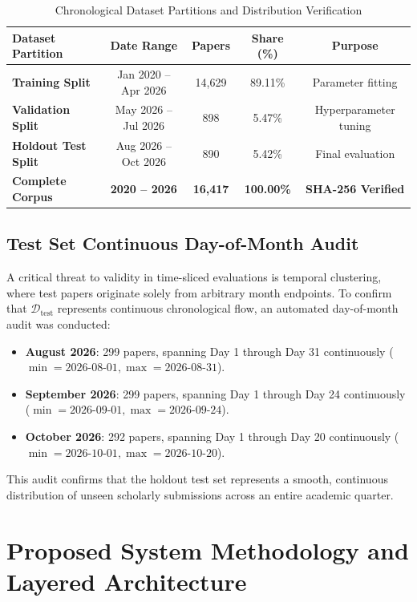 \documentclass[journal]{IEEEtran}
\begin{document}
\begin{table}[t]
\caption{Chronological Dataset Partitions and Distribution Verification}
\label{tab:splits}
\centering
\small
\begin{tabular}{lcccc}
\toprule
\textbf{Dataset Partition} & \textbf{Date Range} & \textbf{Papers} & \textbf{Share (\%)} & \textbf{Purpose} \\
\midrule
\textbf{Training Split} & Jan 2020 -- Apr 2026 & 14,629 & 89.11\% & Parameter fitting \\
\textbf{Validation Split} & May 2026 -- Jul 2026 & 898 & 5.47\% & Hyperparameter tuning \\
\textbf{Holdout Test Split} & Aug 2026 -- Oct 2026 & 890 & 5.42\% & Final evaluation \\
\midrule
\textbf{Complete Corpus} & \textbf{2020 -- 2026} & \textbf{16,417} & \textbf{100.00\%} & \textbf{SHA-256 Verified} \\
\bottomrule
\end{tabular}
\end{table}

\subsection{Test Set Continuous Day-of-Month Audit}
A critical threat to validity in time-sliced evaluations is temporal clustering, where test papers originate solely from arbitrary month endpoints. To confirm that $\mathcal{D}_{\text{test}}$ represents continuous chronological flow, an automated day-of-month audit was conducted:
\begin{itemize}
    \item \textbf{August 2026}: 299 papers, spanning Day 1 through Day 31 continuously ($\min = \text{2026-08-01}, \max = \text{2026-08-31}$).
    \item \textbf{September 2026}: 299 papers, spanning Day 1 through Day 24 continuously ($\min = \text{2026-09-01}, \max = \text{2026-09-24}$).
    \item \textbf{October 2026}: 292 papers, spanning Day 1 through Day 20 continuously ($\min = \text{2026-10-01}, \max = \text{2026-10-20}$).
\end{itemize}
This audit confirms that the holdout test set represents a smooth, continuous distribution of unseen scholarly submissions across an entire academic quarter.

\section{Proposed System Methodology and Layered Architecture}
\end{document}
